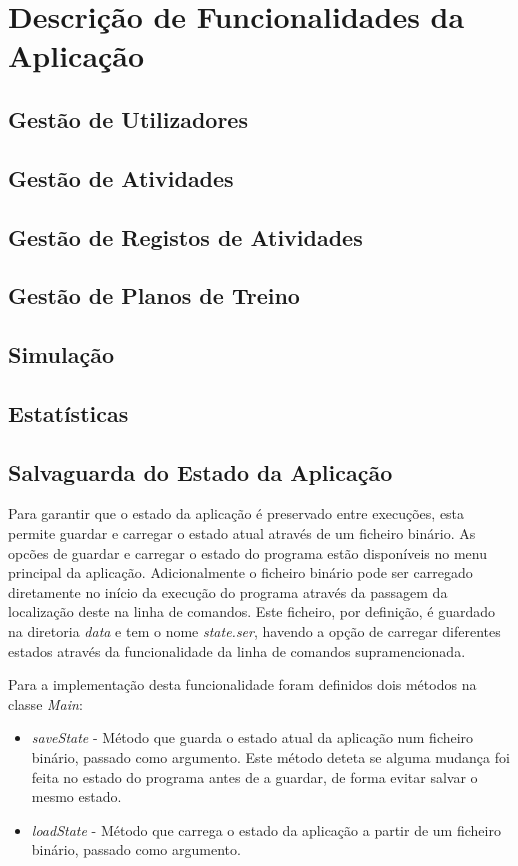 \documentclass[a4paper,12pt]{scrreprt}
\begin{document}
\chapter{Descrição de Funcionalidades da Aplicação}
\section{Gestão de Utilizadores}
\section{Gestão de Atividades}
\section{Gestão de Registos de Atividades}
\section{Gestão de Planos de Treino}
\section{Simulação}
\section{Estatísticas}

\clearpage
\section{Salvaguarda do Estado da Aplicação}
Para garantir que o estado da aplicação é preservado entre execuções, esta
permite guardar e carregar o estado atual através de um ficheiro binário.
As opcões de guardar e carregar o estado do programa estão disponíveis no menu principal da aplicação. Adicionalmente o ficheiro binário pode ser carregado diretamente no início da execução do programa através da passagem da localização deste na linha de comandos.
Este ficheiro, por definição, é guardado na diretoria \textit{data} e tem o nome \textit{state.ser}, havendo a opção de carregar diferentes estados através da funcionalidade da linha de comandos supramencionada.

Para a implementação desta funcionalidade foram definidos dois métodos na classe \textit{Main}:
\begin{itemize}
    \item \textit{saveState} - Método que guarda o estado atual da aplicação num ficheiro binário, passado como argumento. Este método deteta se alguma mudança foi feita no estado do programa antes de a guardar, de forma evitar salvar o mesmo estado.
    \item \textit{loadState} - Método que carrega o estado da aplicação a partir de um ficheiro binário, passado como argumento.
\end{itemize}
\end{document}
